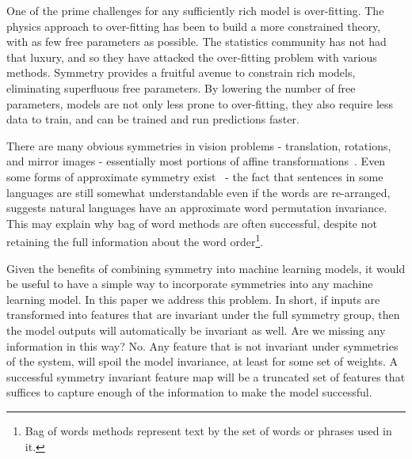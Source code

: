 \documentclass{svproc}
\begin{document}

One of the prime challenges for any sufficiently rich model is over-fitting. The physics approach to over-fitting has been to build a more constrained theory, with as few free parameters as possible. The statistics community has not had that luxury, and so they have attacked the over-fitting problem with various methods. Symmetry provides a fruitful avenue to constrain rich models, eliminating superfluous free parameters. By lowering the number of free parameters, models are not only less prone to over-fitting, they also require less data to train, and can be trained and run predictions faster.


There are many obvious symmetries in vision problems - translation, rotations, and mirror images - essentially most portions of affine transformations~\cite{gens2014deep, dieleman2016exploiting, cohen2016group, henriques2016warped}. Even some forms of approximate symmetry exist~\cite{kiddonsymmetry} - the fact that sentences in some languages are still somewhat understandable even if the words are re-arranged, suggests natural languages have an approximate word permutation invariance. This may explain why bag of word methods are often successful, despite not retaining the full information about the word order\footnote{Bag of words methods represent text by the set of words or phrases used in it.}. 

Given the benefits of combining symmetry into machine learning models, it would be useful to have a simple way to incorporate symmetries into any machine learning model. In this paper we address this problem. In short, if inputs are transformed into features that are invariant under the full symmetry group, then the model outputs will automatically be invariant as well. Are we missing any information in this way? No. Any feature that is not invariant under symmetries of the system, will spoil the model invariance, at least for some set of weights. A successful symmetry invariant feature map will be a truncated set of features that suffices to capture enough of the information to make the model successful.
\end{document}
